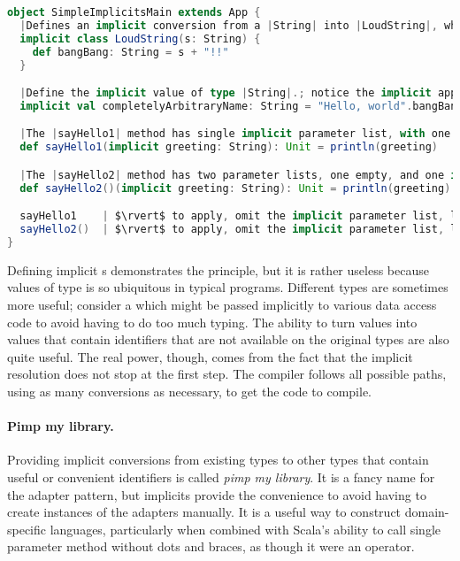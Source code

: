\documentclass[10 pt]{article}
\begin{document}
\begin{lstlisting}[caption={Simple implicits}, label={code:implicits1}, language=Scala, escapechar=|]
object SimpleImplicitsMain extends App {
  |Defines an implicit conversion from a |String| into |LoudString|, which adds the method |bangBang|.|
  implicit class LoudString(s: String) {
    def bangBang: String = s + "!!"
  }

  |Define the implicit value of type |String|.; notice the implicit application of the |LoudString.bangBang|.|
  implicit val completelyArbitraryName: String = "Hello, world".bangBang

  |The |sayHello1| method has single implicit parameter list, with one parameter of type |String|.|
  def sayHello1(implicit greeting: String): Unit = println(greeting)

  |The |sayHello2| method has two parameter lists, one empty, and one implicit with one parameter of type |String|.|
  def sayHello2()(implicit greeting: String): Unit = println(greeting)

  sayHello1    | $\rvert$ to apply, omit the implicit parameter list, leaving just |sayHello1|.|
  sayHello2()  | $\rvert$ to apply, omit the implicit parameter list, leaving just |sayHello2()|.|
}
\end{lstlisting}

Defining implicit s demonstrates the principle, but it is rather useless because values of type  is so ubiquitous in typical programs. Different types are sometimes more useful; consider a  which might be passed implicitly to various data access code to avoid having to do too much typing. The ability to turn values into values that contain identifiers that are not available on the original types are also quite useful. The real power, though, comes from the fact that the implicit resolution does not stop at the first step. The compiler follows all possible paths, using as many conversions as necessary, to get the code to compile. 

\paragraph{Pimp my library.} Providing implicit conversions from existing types to other types that contain useful or convenient identifiers is called \emph{pimp my library}. It is a fancy name for the adapter pattern\cite{adapter-pattern}, but implicits provide the convenience to avoid having to create instances of the adapters manually. It is a useful way to construct domain-specific languages, particularly when combined with Scala's ability to call single parameter method without dots and braces, as though it were an operator.
\end{document}

